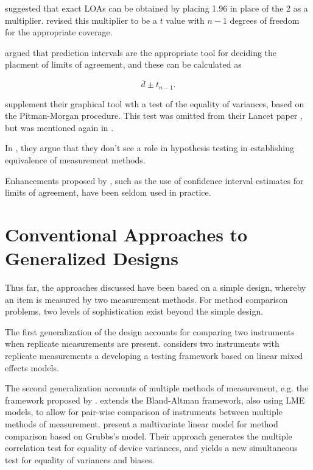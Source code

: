 \documentclass[12pt, a4paper]{report}
\theoremstyle{plain}
\theoremstyle{definition}
\theoremstyle{remark}
\begin{document}


\citet{BA86} suggested that exact LOAs can be obtained by placing 1.96 in place of the 2 as a multiplier. \citet{BA99} revised this multiplier to be a $t$ value with $n-1$ degrees of freedom for the appropriate coverage.


\citet{BXC2008} argued that prediction intervals are the appropriate tool for deciding the placment of limits of agreement, and these can be calculated as

\[ \bar{d} \pm t_{n-1}.\]


\citet{BA83} supplement their graphical tool wth a test of the equality of variances, based on the Pitman-Morgan procedure. This test was omitted from their Lancet paper \citep{BA86}, but was mentioned again in \citet{BA99}.



In \citet{BA99}, they argue that they don't see a role in hypothesis testing in establishing equivalence of measurement methods.


Enhancements proposed by \citet{BA99}, such as the use of confidence interval estimates for limits of agreement, have been seldom used in practice.

\section{Conventional Approaches to Generalized Designs}
Thus far, the approaches discussed have been based on a simple design, whereby an item is measured by two measurement methods. For method comparison problems, two levels of sophistication exist beyond the simple design. 

The first generalization of the design accounts for comparing two instruments when replicate measurements are present. \citet{ARoy2009} considers two instruments with replicate measurements a developing a testing framework based on linear mixed effects models.

The second generalization accounts of multiple methods of measurement, e.g. the framework proposed by \citet{Grubbs73}. \citet{BXC2008} extends the Bland-Altman framework, also using LME models, to allow for pair-wise comparison of instruments between multiple methods of measurement. \citet{christensenblackwood} present a multivariate linear model for method comparison based on Grubbs's model. Their approach generates the multiple  correlation test for equality of device variances, and yields a new simultaneous test for equality of variances and biases.
\end{document}
